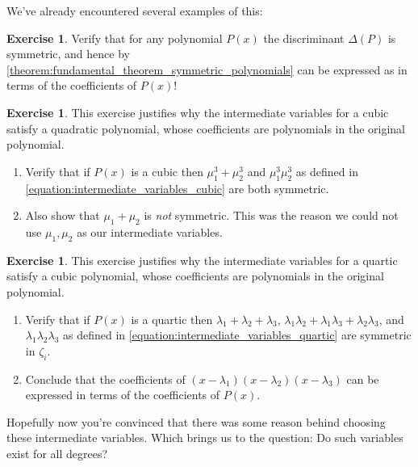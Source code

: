 \documentclass[reqno, 12pt, letter]{article}
\theoremstyle{plain}
\theoremstyle{definition}
\newtheorem{exercise}[theorem]{Exercise}
\theoremstyle{remark}
\numberwithin{equation}{section}
\begin{document}
	We've already encountered several examples of this:
	\begin{exercise}
		Verify that for any polynomial $ P(x)$ the discriminant $ \Delta(P)$ is symmetric, and hence by \autoref{theorem:fundamental_theorem_symmetric_polynomials} can be expressed as in terms of the coefficients of $ P(x)$!
	\end{exercise}
	
	\begin{exercise} This exercise justifies why the intermediate variables for a cubic satisfy a quadratic polynomial, whose coefficients are polynomials in the original polynomial.
		\begin{enumerate}
			\item Verify that if $ P(x)$ is a cubic then $ \mu_1^3 + \mu_2^3 $ and $ \mu_1^3  \mu_2^3$ as defined in \autoref{equation:intermediate_variables_cubic} are both symmetric. 
			\item Also show that $ \mu_1 + \mu_2$ is \emph{not} symmetric. This was the reason we could not use $ \mu_1, \mu_2$ as our intermediate variables.
		\end{enumerate}
	\end{exercise}
	
	\begin{exercise}
		This exercise justifies why the intermediate variables for a quartic satisfy a cubic polynomial, whose coefficients are polynomials in the original polynomial.		\begin{enumerate}
			\item Verify that if $ P(x)$ is a quartic then $ \lambda_1 + \lambda_2 + \lambda_3$, $ \lambda_1 \lambda_2 + \lambda_1 \lambda_3 + \lambda_2 \lambda_3$, and $ \lambda_1 \lambda_2 \lambda_3$ as defined in \autoref{equation:intermediate_variables_quartic} are symmetric in $ \zeta_i$. 
			\item Conclude that the coefficients of $ (x-\lambda_1)(x-\lambda_2)(x-\lambda_3)$ can be expressed in terms of the coefficients of $ P(x)$.
		\end{enumerate}
	\end{exercise}
	
	Hopefully now you're convinced that there was some reason behind choosing these intermediate variables. Which brings us to the question: Do such variables exist for all degrees?
	
\end{document}
